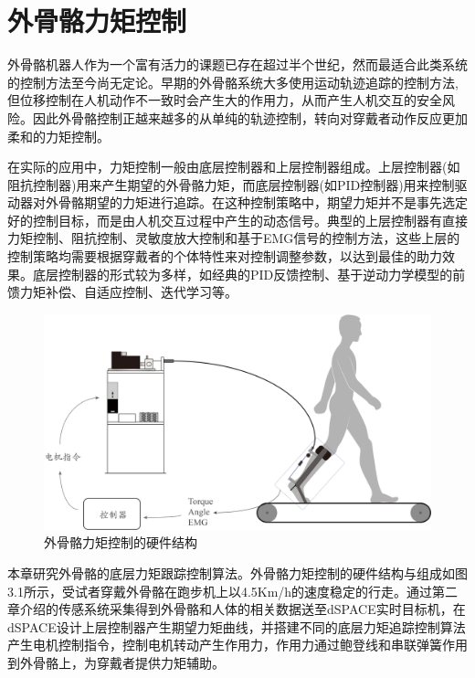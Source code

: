 \chapter{外骨骼力矩控制}

外骨骼机器人作为一个富有活力的课题已存在超过半个世纪，然而最适合此类系统的控制方法至今尚无定论。早期的外骨骼系统大多使用运动轨迹追踪的控制方法,但位移控制在人机动作不一致时会产生大的作用力，从而产生人机交互的安全风险。因此外骨骼控制正越来越多的从单纯的轨迹控制，转向对穿戴者动作反应更加柔和的力矩控制。

在实际的应用中，力矩控制一般由底层控制器和上层控制器组成。上层控制器(如阻抗控制器)用来产生期望的外骨骼力矩，而底层控制器(如PID控制器)用来控制驱动器对外骨骼期望的力矩进行追踪。在这种控制策略中，期望力矩并不是事先选定好的控制目标，而是由人机交互过程中产生的动态信号。典型的上层控制器有直接力矩控制\cite{p32,p33}、阻抗控制\cite{p34}、灵敏度放大控制\cite{p35}和基于EMG信号的控制方法\cite{p36}，这些上层的控制策略均需要根据穿戴者的个体特性来对控制调整参数，以达到最佳的助力效果。底层控制器的形式较为多样，如经典的PID反馈控制\cite{p27,p28}、基于逆动力学模型的前馈力矩补偿\cite{p7,p22,p29}、自适应控制\cite{p30}、迭代学习\cite{p31}等。

\begin{figure}[!h]
    \includegraphics[width=15cm]{fig/f48.jpg}
    \caption{外骨骼力矩控制的硬件结构}
    \label{fig:mark}
\end{figure}

本章研究外骨骼的底层力矩跟踪控制算法。外骨骼力矩控制的硬件结构与组成如图3.1所示，受试者穿戴外骨骼在跑步机上以4.5Km/h的速度稳定的行走。通过第二章介绍的传感系统采集得到外骨骼和人体的相关数据送至dSPACE实时目标机，在dSPACE设计上层控制器产生期望力矩曲线，并搭建不同的底层力矩追踪控制算法产生电机控制指令，控制电机转动产生作用力，作用力通过鲍登线和串联弹簧作用到外骨骼上，为穿戴者提供力矩辅助。

